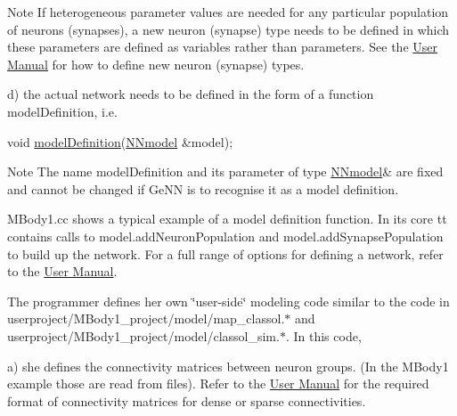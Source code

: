 \begin{DoxyEnumerate}
\begin{DoxyNote}{Note}
 If heterogeneous parameter values are needed for any particular population of neurons (synapses), a new neuron (synapse) type needs to be defined in which these parameters are defined as variables rather than parameters. See the \hyperlink{}{User Manual} for how to define new neuron (synapse) types.
\end{DoxyNote}
d) the actual network needs to be defined in the form of a function {\ttfamily model\+Definition}, i.\+e. 
\begin{DoxyCode}
\textcolor{keywordtype}{void} \hyperlink{tmp_2model_2MBody__userdef_8cc_a9aeaa0a22980484b2c472564fc9f686e}{modelDefinition}(\hyperlink{classNNmodel}{NNmodel} &model); 
\end{DoxyCode}
 \begin{DoxyNote}{Note}
The name {\ttfamily model\+Definition} and its parameter of type {\ttfamily \hyperlink{classNNmodel}{N\+Nmodel}\&} are fixed and cannot be changed if Ge\+N\+N is to recognise it as a model definition.
\end{DoxyNote}
{\ttfamily M\+Body1.\+cc} shows a typical example of a model definition function. In its core tt contains calls to {\ttfamily model.\+add\+Neuron\+Population} and {\ttfamily model.\+add\+Synapse\+Population} to build up the network. For a full range of options for defining a network, refer to the \hyperlink{}{User Manual}.
\item The programmer defines her own \char`\"{}user-\/side\char`\"{} modeling code similar to the code in {\ttfamily userproject/\+M\+Body1\+\_\+project/model/map\+\_\+classol.$\ast$} and {\ttfamily userproject/\+M\+Body1\+\_\+project/model/classol\+\_\+sim.$\ast$}. In this code,

a) she defines the connectivity matrices between neuron groups. (In the M\+Body1 example those are read from files). Refer to the \hyperlink{}{User Manual} for the required format of connectivity matrices for dense or sparse connectivities.


\end{DoxyEnumerate}
